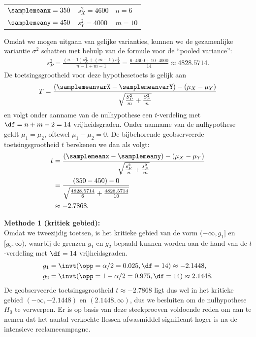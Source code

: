 {    \begin{center}
        \begin{tabular}{lll}
            $\samplemeanx = 350$ & $s_X^2 = 4600$ & $n = 6$ \\
            $\samplemeany = 450$ & $s_Y^2 = 4000$ & $m = 10$ \\
        \end{tabular}
    \end{center}

    \noindent Omdat we mogen uitgaan van gelijke varianties, kunnen we de gezamenlijke variantie $\sigma^2$ schatten met behulp van de formule voor de \enquote{pooled variance}:
    \begin{align*}
        s_P^2 = \frac{(n-1)s_X^2+(m-1)s_Y^2}{n-1+m-1} = \frac{6\cdot 4600 + 10 \cdot 4000}{14} \approx 4828.5714.
    \end{align*}
    De toetsingsgrootheid voor deze hypothesetoets is gelijk aan
    \[
        T = \frac{(\samplemeanvarX - \samplemeanvarY) - (\mu_X - \mu_Y)}{\sqrt{\frac{S_P^2}{m}+\frac{S_P^2}{n}}}
    \]
    en volgt onder aanname van de nulhypothese een $t$-verdeling met $\df = n + m - 2 = 14$ vrijheidsgraden.
    Onder aanname van de nulhypothese geldt $\mu_1 = \mu_2$, oftewel $\mu_1 - \mu_2 = 0$.
    De bijbehorende geobserveerde toetsingsgrootheid $t$ berekenen we dan als volgt:
    \begin{align*}
        t   &= \frac{(\samplemeanx - \samplemeany) - (\mu_X - \mu_Y)}{\sqrt{\frac{s_P^2}{n} + \frac{s_P^2}{m}}} \\
            &= \frac{(350 - 450) - 0}{\sqrt{\frac{4828.5714}{6} + \frac{4828.5714}{10}}} \\
            &\approx -2.7868.
    \end{align*}

    {\noindent\bfseries Methode 1 (kritiek gebied):}\\
    Omdat we tweezijdig toetsen, is het kritieke gebied van de vorm $(-\infty, g_1]$ en $[g_2, \infty)$, waarbij de grenzen $g_1$ en $g_2$ bepaald 
    kunnen worden aan de hand van de $t$-verdeling met $\df=14$ vrijheidsgraden.
    \begin{align*}
        g_1 &= \invt(\opp=\alpha/2 = 0.025, \df=14) \approx -2.1448, \\
        g_2 &= \invt(\opp=1-\alpha/2 = 0.975, \df=14) \approx 2.1448.
    \end{align*}
    De geobserveerde toetsingsgrootheid $t \approx -2.7868$ ligt dus wel in het kritieke gebied $(-\infty, -2.1448)$ en $(2.1448, \infty)$, dus we besluiten om de nulhypothese $H_0$ te verwerpen.
    Er is op basis van deze steekproeven voldoende reden om aan te nemen dat het aantal verkochte flessen afwasmiddel significant hoger is na de intensieve reclamecampagne.\\
    \medskip

}
